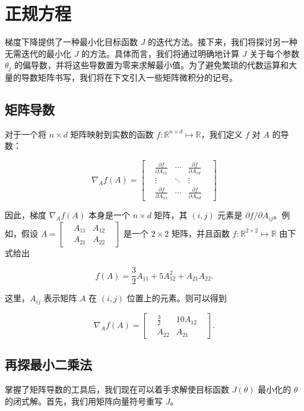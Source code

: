 \section{正规方程}

梯度下降提供了一种最小化目标函数 $J$ 的迭代方法。接下来，我们将探讨另一种无需迭代的最小化 $J$ 的方法。具体而言，我们将通过明确地计算 $J$ 关于每个参数 $\theta_j$ 的偏导数，并将这些导数置为零来求解最小值。为了避免繁琐的代数运算和大量的导数矩阵书写，我们将在下文引入一些矩阵微积分的记号。

\subsection{矩阵导数}

对于一个将 $n \times d$ 矩阵映射到实数的函数 $f: \mathbb{R}^{n \times d} \mapsto \mathbb{R}$，我们定义 $f$ 对 $A$ 的导数：

\[
    \nabla_A f(A) = \begin{bmatrix} 
        &\frac{\partial f}{\partial A_{11}} & \cdots & \frac{\partial f}{\partial A_{1d}} & \\ 
        &\vdots & \ddots & \vdots & \\ 
        &\frac{\partial f}{\partial A_{n1}} & \cdots & \frac{\partial f}{\partial A_{nd}} &
    \end{bmatrix}
\]

因此，梯度 $\nabla_A f(A)$ 本身是一个 $n \times d$ 矩阵，其 $(i, j)$ 元素是 $\partial f / \partial A_{ij}$。例如，假设 $A = \begin{bmatrix} & A_{11} & A_{12} & \\ & A_{21} & A_{22} & \end{bmatrix}$ 是一个 $2 \times 2$ 矩阵，并且函数 $f: \mathbb{R}^{2 \times 2} \mapsto \mathbb{R}$ 由下式给出

\[
    f(A) = \frac{3}{2} A_{11} + 5 A_{12}^2 + A_{21} A_{22}.
\]

这里，$A_{ij}$ 表示矩阵 $A$ 在 $(i, j)$ 位置上的元素。则可以得到

\[
    \nabla_A f(A) = \begin{bmatrix} & \frac{3}{2} & 10A_{12} & \\ & A_{22} & A_{21}& \end{bmatrix}.
\]

\subsection{再探最小二乘法}

掌握了矩阵导数的工具后，我们现在可以着手求解使目标函数 $J(\theta)$ 最小化的 $\theta$ 的闭式解。首先，我们用矩阵向量符号重写 $J$。

